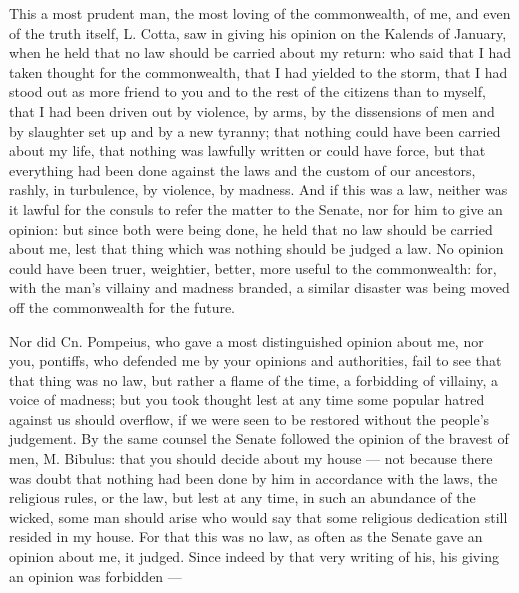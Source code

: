  This a most prudent man, the most loving of the commonwealth, of me, and even of the truth itself, L. Cotta, saw in giving his opinion on the Kalends of January, when he held that no law should be carried about my return: who said that I had taken thought for the commonwealth, that I had yielded to the storm, that I had stood out as more friend to you and to the rest of the citizens than to myself, that I had been driven out by violence, by arms, by the dissensions of men and by slaughter set up and by a new tyranny; that nothing could have been carried about my life, that nothing was lawfully written or could have force, but that everything had been done against the laws and the custom of our ancestors, rashly, in turbulence, by violence, by madness. And if this was a law, neither was it lawful for the consuls to refer the matter to the Senate, nor for him to give an opinion: but since both were being done, he held that no law should be carried about me, lest that thing which was nothing should be judged a law. No opinion could have been truer, weightier, better, more useful to the commonwealth: for, with the man's villainy and madness branded, a similar disaster was being moved off the commonwealth for the future.

 Nor did Cn. Pompeius, who gave a most distinguished opinion about me, nor you, pontiffs, who defended me by your opinions and authorities, fail to see that that thing was no law, but rather a flame of the time, a forbidding of villainy, a voice of madness; but you took thought lest at any time some popular hatred against us should overflow, if we were seen to be restored without the people's judgement. By the same counsel the Senate followed the opinion of the bravest of men, M. Bibulus: that you should decide about my house --- not because there was doubt that nothing had been done by him in accordance with the laws, the religious rules, or the law, but lest at any time, in such an abundance of the wicked, some man should arise who would say that some religious dedication still resided in my house. For that this was no law, as often as the Senate gave an opinion about me, it judged. Since indeed by that very writing of his, his giving an opinion was forbidden ---

